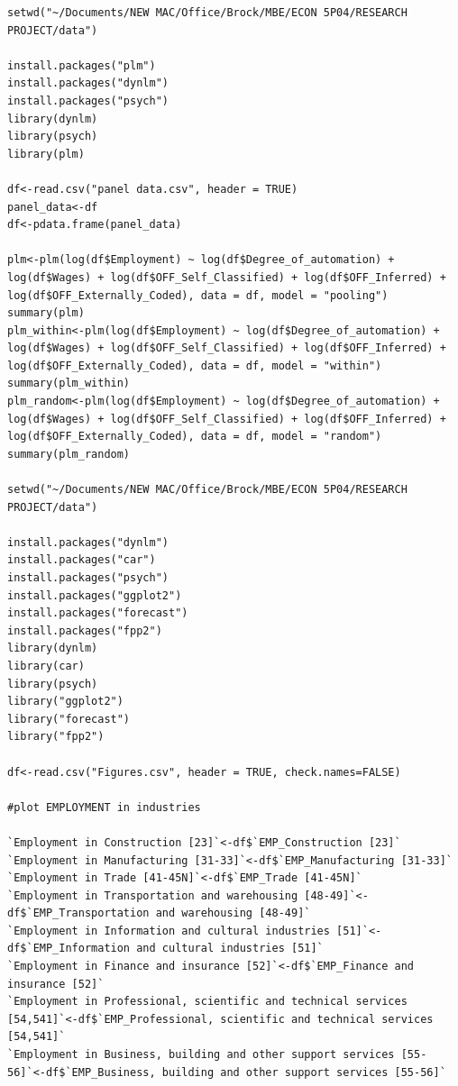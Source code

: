 \documentclass[12pt]{article}
\begin{document}
\begin{verbatim}
setwd("~/Documents/NEW MAC/Office/Brock/MBE/ECON 5P04/RESEARCH PROJECT/data")

install.packages("plm")
install.packages("dynlm")
install.packages("psych")
library(dynlm)
library(psych)
library(plm)

df<-read.csv("panel data.csv", header = TRUE)
panel_data<-df
df<-pdata.frame(panel_data)

plm<-plm(log(df$Employment) ~ log(df$Degree_of_automation) + log(df$Wages) + log(df$OFF_Self_Classified) + log(df$OFF_Inferred) + log(df$OFF_Externally_Coded), data = df, model = "pooling")
summary(plm)
plm_within<-plm(log(df$Employment) ~ log(df$Degree_of_automation) + log(df$Wages) + log(df$OFF_Self_Classified) + log(df$OFF_Inferred) + log(df$OFF_Externally_Coded), data = df, model = "within")
summary(plm_within)
plm_random<-plm(log(df$Employment) ~ log(df$Degree_of_automation) + log(df$Wages) + log(df$OFF_Self_Classified) + log(df$OFF_Inferred) + log(df$OFF_Externally_Coded), data = df, model = "random")
summary(plm_random)

setwd("~/Documents/NEW MAC/Office/Brock/MBE/ECON 5P04/RESEARCH PROJECT/data")

install.packages("dynlm")
install.packages("car")
install.packages("psych")
install.packages("ggplot2")
install.packages("forecast")
install.packages("fpp2")
library(dynlm)
library(car)
library(psych)
library("ggplot2")
library("forecast")
library("fpp2")

df<-read.csv("Figures.csv", header = TRUE, check.names=FALSE)

#plot EMPLOYMENT in industries

`Employment in Construction [23]`<-df$`EMP_Construction [23]`
`Employment in Manufacturing [31-33]`<-df$`EMP_Manufacturing [31-33]`
`Employment in Trade [41-45N]`<-df$`EMP_Trade [41-45N]`
`Employment in Transportation and warehousing [48-49]`<-df$`EMP_Transportation and warehousing [48-49]`
`Employment in Information and cultural industries [51]`<-df$`EMP_Information and cultural industries [51]`
`Employment in Finance and insurance [52]`<-df$`EMP_Finance and insurance [52]`
`Employment in Professional, scientific and technical services [54,541]`<-df$`EMP_Professional, scientific and technical services [54,541]`
`Employment in Business, building and other support services [55-56]`<-df$`EMP_Business, building and other support services [55-56]`	


\end{verbatim}
\end{document}
